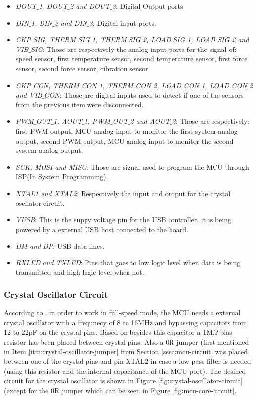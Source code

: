 			\begin{itemize}
				\item\textit{DOUT$\_$1, DOUT$\_$2 and DOUT$\_$3}: Digital Output ports	
				\item\textit{DIN$\_$1, DIN$\_$2 and DIN$\_$3}: Digital input ports.
				\item\textit{CKP$\_$SIG, THERM$\_$SIG$\_$1, THERM$\_$SIG$\_$2, LOAD$\_$SIG$\_$1, LOAD$\_$SIG$\_$2 and VIB$\_$SIG}: Those are respectively the analog input ports for the signal of: speed sensor, first temperature sensor, second temperature sensor, first force sensor, second force sensor, cibration sensor.
				\item\textit{CKP$\_$CON, THERM$\_$CON$\_$1, THERM$\_$CON$\_$2, LOAD$\_$CON$\_$1, LOAD$\_$CON$\_$2 and VIB$\_$CON}: Those are digital inputs used to detect if one of the sensors from the previous item were disconnected.
				\item\textit{PWM$\_$OUT$\_$1, AOUT$\_$1, PWM$\_$OUT$\_$2 and AOUT$\_$2}: Those are respectively: first PWM output, MCU analog input to monitor the first system analog output, second PWM output, MCU analog input to monitor the second system analog output.
				\item\textit{SCK, MOSI and MISO}: Those are signal used to program the MCU through ISP(In System Programming).
				\item\textit{XTAL1 and XTAL2}: Respectively the input and output for the crystal oscilator circuit.
				\item\textit{VUSB}: This is the suppy voltage pin for the USB controller, it is being powered by a external USB host connected to the board.
				\item\textit{DM and DP}: USB data lines.
				\item\textit{RXLED and TXLED}: Pins that goes to low logic level when data is being transmitted and high logic level when not.
			\end{itemize}

		\subsubsection{Crystal Oscillator Circuit}\label{sssec:crystal-oscillator-circuit}
			According to \cite{atmega32u4-datasheet}, in order to work in full-speed mode, the MCU needs a external crystal oscillator with a frequnecy of 8 to 16MHz and bypassing capacitors from 12 to 22pF on the crystal pins. Based on \cite{arduino-leonardo-schematic} besides this capacitor a 1M$\Omega$ bias resistor has been placed between crystal pins. Also a 0R jumper (first mentioned in Item \ref{itm:crystal-oscillator-jumper} from Section \ref{ssec:mcu-circuit} was placed between one of the crystal pins and pin XTAL2 in case a low pass filter is needed (using this resistor and the internal capacitance of the MCU port). The desined circuit for the crystal oscillator is shown in Figure \ref{fig:crystal-oscillator-circuit} (except for the 0R jumper which can be seen in Figure \ref{fig:mcu-core-circuit}.

